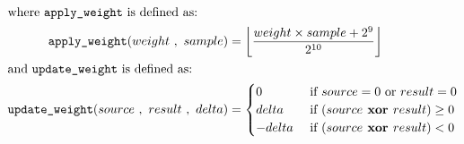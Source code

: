 {\par
\noindent
\begin{align*}
\intertext{where \texttt{apply\_weight} is defined as:}
\texttt{apply\_weight}(weight~,~sample) &= \left\lfloor\frac{weight \times sample + 2 ^ 9}{2 ^ {10}}\right\rfloor \\
\intertext{and \texttt{update\_weight} is defined as:}
\texttt{update\_weight}(source~,~result~,~delta) &=
\begin{cases}
0 & \text{ if } source = 0 \text{ or } result = 0 \\
delta & \text{ if } (source \textbf{ xor } result ) \geq 0 \\
-delta & \text{ if } (source \textbf{ xor } result) < 0
\end{cases}
\end{align*}

}

\clearpage

